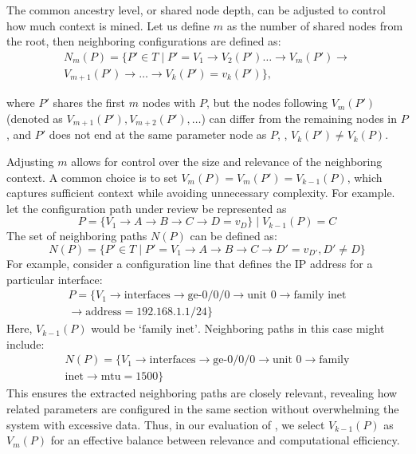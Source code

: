     The common ancestry level, or shared node depth, can be adjusted to control how much context is mined. Let us define \( m \) as the number of shared nodes from the root, then neighboring configurations are defined as:
\begin{multline*}
N_m(P) = \{ P' \in T \mid P' = V_1 \rightarrow  V_2(P')\dots \rightarrow V_m(P') \rightarrow \\ V_{m+1}(P') \rightarrow \dots \rightarrow V_k(P')= v_k(P') \},
\end{multline*}

where \( P' \) shares the first \( m \) nodes with \( P \), but the nodes following \( V_m(P') \) (denoted as \( V_{m+1}(P'), V_{m+2}(P'), \dots \)) can differ from the remaining nodes in \( P \), and 
\(P'\) does not end at the same parameter node as \(P\), \ie, \( V_k(P') \neq V_k(P) \).




Adjusting \( m \) allows for control over the size and relevance of the neighboring context.
A common choice is to set \(V_m(P) = V_m(P') = V_{k-1}(P) \), which captures sufficient context while avoiding unnecessary complexity. For example. let the configuration path under review be represented as
\[
P = \{V_1 \rightarrow A \rightarrow B \rightarrow C \rightarrow D = v_D \} \mid V_{k-1}(P) = C
\]
The set of neighboring paths \( N(P) \) can be defined as:
\[
N(P) = \{ P' \in T \mid P' = V_1 \rightarrow A \rightarrow B \rightarrow C \rightarrow D' = v_{D'}, D' \neq D \}
\]
For example, consider a configuration line that defines the IP address for a particular interface:
\begin{multline*}
P = \{V_1 \rightarrow \text{interfaces} \rightarrow \text{ge-0/0/0} 
\rightarrow \text{unit 0} \rightarrow \text{family inet}\\
\rightarrow \text{address} = 192.168.1.1/24 \}
\end{multline*}
Here, \(V_{k-1}(P)\) would be \( \text{`family inet'} \). Neighboring paths in this case might include:
\begin{multline*}
N(P) = \{V_1 \rightarrow \text{interfaces} \rightarrow \text{ge-0/0/0}
\rightarrow \text{unit 0} \rightarrow
\text{family}\\ \text{inet} \rightarrow \text{mtu} = 1500 \}
\end{multline*}
This ensures the extracted neighboring paths are closely relevant, revealing how related parameters are configured in the same section without overwhelming the system with excessive data. Thus, in our evaluation of \sysname{}, we select \(V_{k-1}(P)\) as  \( V_m(P) \) for an effective balance between relevance and computational efficiency.


